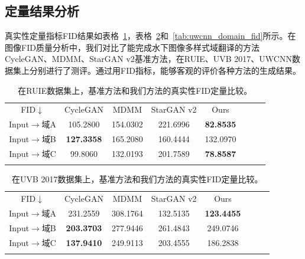 \subsection{定量结果分析}
真实性定量指标FID结果如表格~\ref{tab:ruie_domain_fid}，表格~\ref{tab:uvb_domain_fid}和~\ref{tab:uwcnn_domain_fid}所示。在图像FID质量分析中，我们对比了能完成水下图像多样式域翻译的方法CycleGAN、MDMM、StarGAN v2基准方法，在RUIE、UVB 2017、UWCNN数据集上分别进行了测评。通过用FID指标，能够客观的评价各种方法的生成结果。

\begin{table}[ht]
\centering
\caption{在RUIE数据集上，基准方法和我们方法的真实性FID定量比较。}
  \begin{tabular}{c|ccccccc}
    \hline\noalign{\smallskip}
    FID$\downarrow$ & CycleGAN & MDMM & StarGAN v2 & Ours \\
    \noalign{\smallskip}\hline\noalign{\smallskip}
    Input$\rightarrow$域A & 105.2800 & 154.0302 & 221.6996 & \textbf{82.8535}  \\
    Input$\rightarrow$域B & \textbf{127.3358} & 165.2080 & 160.4444 & 132.0970  \\
    Input$\rightarrow$域C & 99.8060 & 132.0193 & 201.7589 & \textbf{78.8587}  \\
    \noalign{\smallskip}\hline
  \end{tabular}
  \label{tab:ruie_domain_fid}
\end{table}

\begin{table}[ht]
\centering
\caption{在UVB 2017数据集上，基准方法和我们方法的真实性FID定量比较。}
  \begin{tabular}{c|ccccccc}
    \hline\noalign{\smallskip}
    FID$\downarrow$ & CycleGAN & MDMM & StarGAN v2 & Ours \\
    \noalign{\smallskip}\hline\noalign{\smallskip}
    Input$\rightarrow$域A & 231.2559 & 308.1764 & 132.5135 & \textbf{123.4455}  \\
    Input$\rightarrow$域B & \textbf{203.3703} & 277.9446 & 261.4843 & 249.0746  \\
    Input$\rightarrow$域C & \textbf{137.9410} & 249.9113 & 203.4555 & 186.2838  \\
    \noalign{\smallskip}\hline
  \end{tabular}
  \label{tab:uvb_domain_fid}
\end{table}

